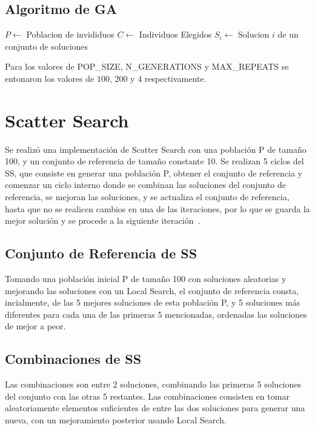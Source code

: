 \documentclass{ci5652}
\begin{document}
\subsection{Algoritmo de GA}
\begin{algorithm}
\DontPrintSemicolon
$P \leftarrow$ Poblacion de invididuos\;
$C \leftarrow$ Individuos Elegidos\;
$S_i \leftarrow$ Solucion $i$ de un conjunto de soluciones\;
\end{algorithm}

Para los valores de POP\_SIZE, N\_GENERATIONS y MAX\_REPEATS se entonaron los valores de $100$, $200$ y $4$ respectivamente.

\section{Scatter Search}
Se realizó una implementación de Scatter Search con una población P de tamaño 100, y un conjunto de referencia de tamaño constante 10. Se realizan 5 ciclos del SS, que consiste en generar una población P, obtener el conjunto de referencia y comenzar un ciclo interno donde se combinan las soluciones del conjunto de referencia, se mejoran las soluciones, y se actualiza el conjunto de referencia, hasta que no se realicen cambios en una de las iteraciones, por lo que se guarda la mejor solución y se procede a la siguiente iteración~\cite{ssmarti}.

\subsection{Conjunto de Referencia de SS}
Tomando una población inicial P de tamaño 100 con soluciones aleatorias y mejorando las soluciones con un Local Search, el conjunto de referencia consta, incialmente, de las 5 mejores soluciones de esta población P, y 5 soluciones más diferentes para cada una de las primeras 5 mencionadas, ordenadas las soluciones de mejor a peor.

\subsection{Combinaciones de SS}
Las combinaciones son entre 2 soluciones, combinando las primeras 5 soluciones del conjunto con las otras 5 restantes. Las combinaciones consisten en tomar aleatoriamente elementos suficientes de entre las dos soluciones para generar una nueva, con un mejoramiento posterior usando Local Search.
\end{document}
